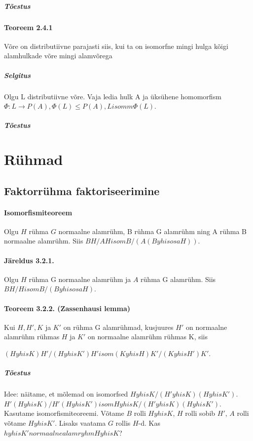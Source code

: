 \documentclass[12pt]{report}
\numberwithin{equation}{section}
\theoremstyle{definition}
\theoremstyle{plain}
\begin{document}
\subparagraph{Tõestus}


\paragraph{Teoreem 2.4.1}
Võre on distributiivne parajasti siis, kui ta on isomorfne mingi hulga kõigi alamhulkade võre mingi alamvõrega

\subparagraph{Selgitus}
Olgu L distributiivne võre. Vaja ledia hulk A ja \"uks\"uhene homomorfism $\Phi : L \rightarrow P(A), \Phi(L) \leq P(A), L isomm \Phi(L)$. 

\subparagraph{Tõestus}

\section{R\"uhmad}

\subsection{Faktorr\"uhma faktoriseerimine}

\paragraph{Isomorfismiteoreem}
Olgu $H$ rühma $G$ normaalne alamr\"uhm, B r\"uhma G alamr\"uhm ning A r\"uhma B normaalne alamr\"uhm. Siis $BH/AH isom B/(A(B yhisosa H))$.

\paragraph{Järeldus 3.2.1.}
Olgu $H$ r\"uhma G normaalne alamr\"uhm ja $A$ r\"uhma G alamr\"uhm. Siis $BH/H isom B/(B yhisosa H)$.

\paragraph{Teoreem 3.2.2. (Zassenhausi lemma)}
Kui $H,H',K$ ja $K'$ on rühma G alamrühmad, kusjuures $H'$ on normaalne alamr\"uhm r\"uhmas $H$ ja $K'$ on normaalne alamr\"uhm r\"uhmas K, siis

$(H yhis K)H'/(H yhis K')H' isom (K yhis H)K'/(K yhis H')K'$.

\subparagraph{Tõestus}

Idee: näitame, et mõlemad on isomorfsed $H yhis K / (H' yhis K)(H yhis K')$.
$H'(H yhis K) / H'(H yhis K') isom H yhis K / (H' yhis K)(H yhis K')$.
Kasutame isomorfismiteoreemi. Võtame $B$ rolli $H yhis K$, $H$ rolli sobib  $H'$, $A$ rolli võtame $H yhis K'$. Lisaks vaatama $G$ rollis $H$-d. Kas $h yhis K' normaalne alamryhm H yhis K$?
\end{document}
